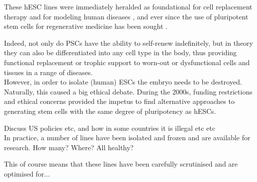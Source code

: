 



These hESC lines were immediately heralded as foundational for cell replacement therapy and for modeling human diseases 
\cite{saha2009technical}, and ever since the use of pluripotent stem cells for regenerative medicine has been sought \cite{kimbrel2015current}.

Indeed, not only do PSCs have the ability to self-renew indefinitely, but in theory they can also be differentiated into any cell type in the body, thus providing functional replacement or trophic support to worn-out or dysfunctional cells and tissues in a range of diseases. \\

However, in order to isolate (human) ESCs the embryo needs to be destroyed.
Naturally, this caused a big ethical debate.
During the 2000s, funding restrictions and ethical concerns provided the impetus to find alternative approaches to generating stem cells with the same degree of pluripotency as hESCs. 


Discuss US policies etc, and how in some countries it is illegal etc etc\\

In practice, a number of lines have been isolated and frozen and are available for research.
How many? Where? All healthy?

This of course means that these lines have been carefully scrutinised and are optimised for...


